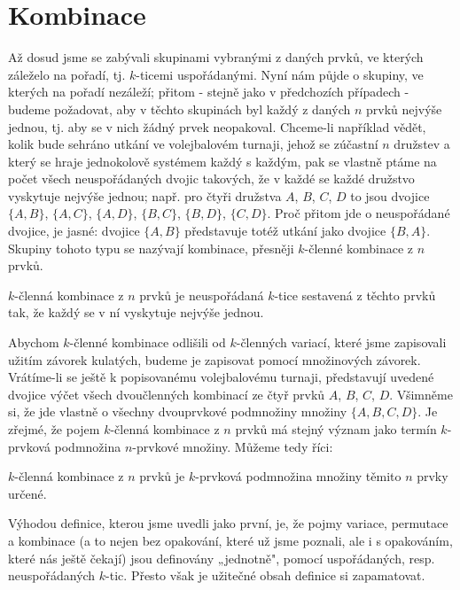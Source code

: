   \section{Kombinace}\label{mai:IchapIVcsecIV}
    Až dosud jsme se zabývali skupinami vybranými z daných prvků, ve kterých záleželo na pořadí, tj.
    \(k\)-ticemi uspořádanými. Nyní nám půjde o skupiny, ve kterých na pořadí nezáleží; přitom -
    stejně jako v předchozích případech - budeme požadovat, aby v těchto skupinách byl každý z
    daných \(n\) prvků nejvýše jednou, tj. aby se v nich žádný prvek neopakoval. Chceme-li například
    vědět, kolik bude sehráno utkání ve volejbalovém turnaji, jehož se zúčastní \(n\) družstev a
    který se hraje jednokolově systémem každý s každým, pak se vlastně ptáme na počet všech
    neuspořádaných dvojic takových, že v každé se každé družstvo vyskytuje nejvýše jednou; např. pro
    čtyři družstva \(A\), \(B\), \(C\), \(D\) to jsou dvojice \(\{A, B\}\), \(\{A,C\}\), \(\{A,
    D\}\), \(\{B,C\}\), \(\{B, D\}\), \(\{C, D\}\). Proč přitom jde o neuspořádané dvojice, je
    jasné: dvojice \(\{A, B\}\) představuje totéž utkání jako dvojice \(\{B, A\}\). Skupiny tohoto
    typu se nazývají kombinace, přesněji \(k\)-členné kombinace z \(n\) prvků.

    \begin{mdframed}[style=highlight] \(k\)-členná kombinace z \(n\) prvků je neuspořádaná
      \(k\)-tice sestavená z těchto prvků tak, že každý se v ní vyskytuje nejvýše jednou.
    \end{mdframed}  

    Abychom \(k\)-členné kombinace odlišili od \(k\)-členných variací, které jsme zapisovali užitím
    závorek kulatých, budeme je zapisovat pomocí množinových závorek. Vrátíme-li se ještě k
    popisovanému volejbalovému turnaji, představují uvedené dvojice výčet všech dvoučlenných
    kombinací ze čtyř prvků \(A\), \(B\), \(C\), \(D\). Všimněme si, že jde vlastně o všechny
    dvouprvkové podmnožiny množiny \(\{A, B, C, D\}\). Je zřejmé, že pojem \(k\)-členná kombinace z
    \(n\) prvků má stejný význam jako termín \(k\)-prvková podmnožina \(n\)-prvkové množiny. Můžeme
    tedy říci:

    \begin{mdframed}[style=highlight] \(k\)-členná kombinace z \(n\) prvků je \(k\)-prvková
      podmnožina množiny těmito \(n\) prvky určené.
    \end{mdframed}  

    Výhodou definice, kterou jsme uvedli jako první, je, že pojmy variace, permutace a kombinace (a
    to nejen bez opakování, které už jsme poznali, ale i s opakováním, které nás ještě čekají) jsou
    definovány „jednotně", pomocí uspořádaných, resp. neuspořádaných \(k\)-tic. Přesto však je
    užitečné obsah  definice si zapamatovat.
    
